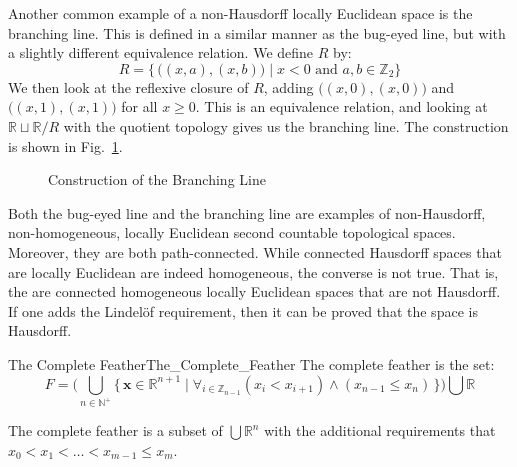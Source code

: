 \documentclass{article}                                                        %
\begin{document}
        Another common example of a non-Hausdorff locally Euclidean space is
        the branching line. This is defined in a similar manner as the
        bug-eyed line, but with a slightly different equivalence relation.
        We define $R$ by:
        \begin{equation}
                R=\big\{\,\big((x,a),(x,b)\big)\;|\;
                    x<0\textrm{ and }a,b\in\mathbb{Z}_{2}\big\}
        \end{equation}
        We then look at the reflexive closure of $R$, adding
        $\big((x,0),(x,0)\big)$ and $\big((x,1),(x,1)\big)$ for all
        $x\geq{0}$. This is an equivalence relation, and looking at
        $\mathbb{R}\sqcup\mathbb{R}/R$ with the quotient topology gives us
        the branching line. The construction is shown in
        Fig.~\ref{fig:Construction_of_Branching_Line}.
        \begin{figure}[H]
                \centering
                \captionsetup{type=figure}
                
                \caption{Construction of the Branching Line}
                \label{fig:Construction_of_Branching_Line}
        \end{figure}
        Both the bug-eyed line and the branching line are examples of
        non-Hausdorff, non-homogeneous, locally Euclidean second countable
        topological spaces. Moreover, they are both path-connected. While
        connected Hausdorff spaces that are locally Euclidean are indeed
        homogeneous, the converse is not true. That is, the are connected
        homogeneous locally Euclidean spaces that are not Hausdorff. If one
        adds the Lindel\"{o}f requirement, then it can be proved that the
        space is Hausdorff.
        \begin{fdefinition}{The Complete Feather}{The_Complete_Feather}
                The complete feather is the set:
                \begin{equation*}
                    F=\Big(\bigcup_{n\in\mathbb{N}^{+}}
                        \big\{\,\mathbf{x}\in\mathbb{R}^{n+1}\;|\;
                            \forall_{i\in\mathbb{Z}_{n-1}}(x_{i}<x_{i+1})
                            \land(x_{n-1}\leq{x}_{n})\,\big\}\Big)
                        \bigcup\mathbb{R}
                \end{equation*}
        \end{fdefinition}
        The complete feather is a subset of $\bigcup\mathbb{R}^{n}$ with the
        additional requirements that $x_{0}<x_{1}<\dots<x_{m-1}\leq{x}_{m}$.
\end{document}
